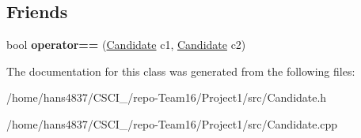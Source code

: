 \subsection*{Friends}
\begin{DoxyCompactItemize}
\item 
\mbox{\label{classCandidate_ab8aa4bfa45d2a47423d3c31bacc7c293}} 
bool {\bfseries operator==} (\hyperlink{classCandidate}{Candidate} c1, \hyperlink{classCandidate}{Candidate} c2)
\end{DoxyCompactItemize}


The documentation for this class was generated from the following files\+:\begin{DoxyCompactItemize}
\item 
/home/hans4837/\+C\+S\+C\+I\+\_/repo-\/\+Team16/\+Project1/src/Candidate.\+h\item 
/home/hans4837/\+C\+S\+C\+I\+\_/repo-\/\+Team16/\+Project1/src/Candidate.\+cpp\end{DoxyCompactItemize}
